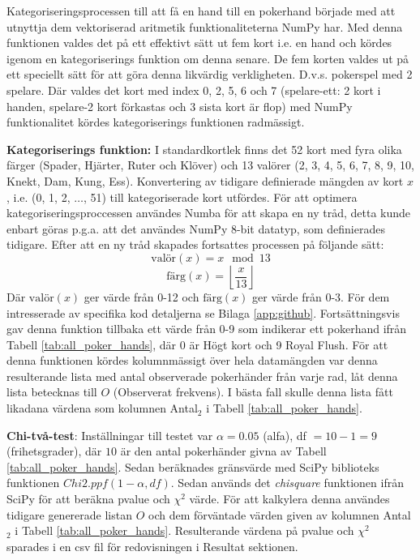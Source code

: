 \documentclass[swedish,a4paper]{article}
\begin{document}
\noindent
Kategoriseringsprocessen till att få en hand till en pokerhand började med
att utnyttja dem vektoriserad aritmetik funktionaliteterna NumPy har. Med denna 
funktionen valdes det på ett effektivt sätt ut fem kort i.e. en hand och kördes igenom
en kategoriserings funktion om denna senare. De fem korten valdes ut på ett
speciellt sätt för att göra denna likvärdig verkligheten. D.v.s. pokerspel med 2
spelare. Där valdes det kort med index 0, 2, 5, 6 och 7 (spelare-ett:  2 kort i
handen, spelare-2 kort förkastas och 3 sista kort är flop) med NumPy funktionalitet
kördes kategoriserings funktionen radmässigt.

\textbf{Kategoriserings funktion:}
I standardkortlek finns det 52 kort med fyra olika 
färger (Spader, Hjärter, Ruter och Klöver) och 13 valörer 
(2, 3, 4, 5, 6, 7, 8, 9, 10, Knekt, Dam, Kung, Ess). Konvertering av tidigare
definierade mängden av kort $x$, i.e. (0, 1, 2, $\dots$, 51) till kategoriserade
kort utfördes. För att optimera kategoriseringsproccessen användes Numba för att skapa en
ny tråd, detta kunde enbart göras p.g.a. att det användes NumPy 8-bit datatyp, som definierades tidigare. Efter att en ny tråd skapades fortsattes processen på följande sätt: 
\begin{equation}
    \text{valör}(x) = x \mod 13
\end{equation}
\begin{equation}
    \text{färg}(x) = \left\lfloor \frac{x}{13} \right\rfloor
\end{equation}
Där $\text{valör}(x)$ ger värde från 0-12 och $\text{färg}(x)$ ger värde från
0-3. För dem intresserade av specifika kod detaljerna se Bilaga
\ref{app:github}. Fortsättningsvis gav denna funktion tillbaka ett värde från
0-9 som indikerar ett pokerhand ifrån Tabell \ref{tab:all_poker_hands}, där 0 är
Högt kort och 9 Royal Flush. För att denna funktionen kördes kolumnmässigt över
hela datamängden var denna resulterande 
lista med antal observerade pokerhänder från varje rad, låt denna lista betecknas till
$O$ (Observerat frekvens). I bästa fall skulle denna lista
fått likadana värdena som kolumnen Antal$_2$ i Tabell \ref{tab:all_poker_hands}.


\textbf{Chi-två-test}: Inställningar till testet var $\alpha = 0.05$
(\gls{alfa}), df $= 10 -
1 = 9$ (frihetsgrader), där $10$ är den antal pokerhänder givna av Tabell
\ref{tab:all_poker_hands}. Sedan beräknades gränsvärde med SciPy \gls{bibliotek}s
funktionen $Chi2.ppf( 1 - \alpha, df)$. Sedan används det \textit{chisquare}
funktionen ifrån SciPy för att beräkna \gls{pvalue} och $\chi^2$ värde. För att
kalkylera denna användes tidigare genererade listan $O$ och dem förväntade värden given av
kolumnen Antal$_2$ i Tabell \ref{tab:all_poker_hands}. Resulterande värdena på
\gls{pvalue} och $\chi^2$ sparades i en csv fil för redovisningen i Resultat
sektionen.
\end{document}

